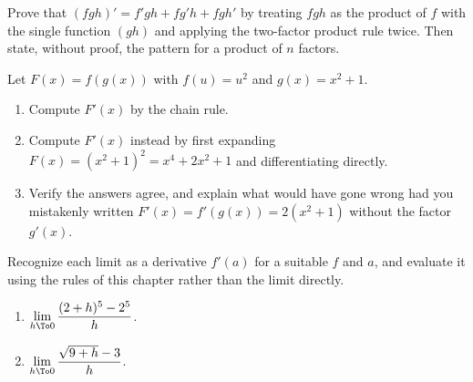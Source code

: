 \begin{exercise}
Prove that $(fgh)' = f'gh + fg'h + fgh'$ by treating $fgh$ as the product of $f$ with the
single function $(gh)$ and applying the two-factor product rule twice. Then state, without
proof, the pattern for a product of $n$ factors.
\end{exercise}

\begin{exercise}
Let $F(x) = f(g(x))$ with $f(u) = u^2$ and $g(x) = x^2 + 1$.
\begin{enumerate}
  \item Compute $F'(x)$ by the chain rule.
  \item Compute $F'(x)$ instead by first expanding $F(x) = (x^2+1)^2 = x^4 + 2x^2 + 1$ and
        differentiating directly.
  \item Verify the answers agree, and explain what would have gone wrong had you mistakenly
        written $F'(x) = f'(g(x)) = 2(x^2+1)$ without the factor $g'(x)$.
\end{enumerate}
\end{exercise}

\begin{exercise}
Recognize each limit as a derivative $f'(a)$ for a suitable $f$ and $a$, and evaluate it
using the rules of this chapter rather than the limit directly.
\begin{enumerate}
  \item $\displaystyle\lim_{h\To 0}\frac{(2+h)^5 - 2^5}{h}$.
  \item $\displaystyle\lim_{h\To 0}\frac{\sqrt{9+h} - 3}{h}$.
\end{enumerate}
\end{exercise}
